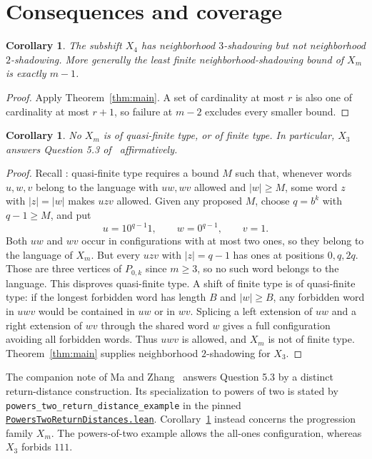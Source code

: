 \documentclass[11pt]{article}
\newtheorem{corollary}[theorem]{Corollary}
\begin{document}
\section{Consequences and coverage}
\begin{corollary}\label{cor:rank}
The subshift $X_4$ has neighborhood $3$-shadowing but not neighborhood
$2$-shadowing. More generally the least finite neighborhood-shadowing
bound of $X_m$ is exactly $m-1$.
\end{corollary}
\begin{proof}
Apply Theorem~\ref{thm:main}. A set of cardinality at most $r$ is also
one of cardinality at most $r+1$, so failure at $m-2$ excludes every
smaller bound.
\end{proof}

\begin{corollary}\label{cor:qft}
No $X_m$ is of quasi-finite type, or of finite type. In particular,
$X_3$ answers Question 5.3 of~\cite{MS} affirmatively.
\end{corollary}
\begin{proof}
Recall \cite[Definition 3.5]{MS}: quasi-finite type requires a bound $M$
such that, whenever words $u,w,v$ belong to the language with $uw,wv$
allowed and $|w|\geq M$, some word $z$ with $|z|=|w|$ makes $uzv$
allowed. Given any proposed $M$, choose $q=b^k$ with $q-1\geq M$,
and put
\[
 u=10^{q-1}1,\qquad w=0^{q-1},\qquad v=1.
\]
Both $uw$ and $wv$ occur in configurations with at most two ones,
so they belong to the language of $X_m$. But every $uzv$ with
$|z|=q-1$ has ones at positions $0,q,2q$. Those are three vertices of
$P_{0,k}$ since $m\geq3$, so no such word belongs to the language.
This disproves quasi-finite type. A shift of finite type is of
quasi-finite type: if the longest forbidden word has length $B$ and
$|w|\geq B$, any forbidden word in $uwv$ would be contained in $uw$
or in $wv$. Splicing a left extension of $uw$ and a right extension of
$wv$ through the shared word $w$ gives a full configuration avoiding
all forbidden words. Thus $uwv$ is allowed, and $X_m$ is not of finite type.
Theorem~\ref{thm:main} supplies neighborhood $2$-shadowing for $X_3$.
\end{proof}

The companion note of Ma and Zhang~\cite{MZ} answers Question 5.3
by a distinct return-distance construction. Its specialization to powers
of two is stated by \nolinkurl{powers_two_return_distance_example}
in the pinned
\href{https://github.com/the-omega-institute/trureturing/blob/147008bff5524a3dccf0efa3ed9e76fb6b168a50/D5/S1/Dynamics/Shadowing/PowersTwoReturnDistances.lean}{\texttt{PowersTwoReturnDistances.lean}}.
Corollary~\ref{cor:qft} instead concerns the progression family $X_m$.
The powers-of-two example allows the all-ones configuration, whereas
$X_3$ forbids $111$.
\end{document}
